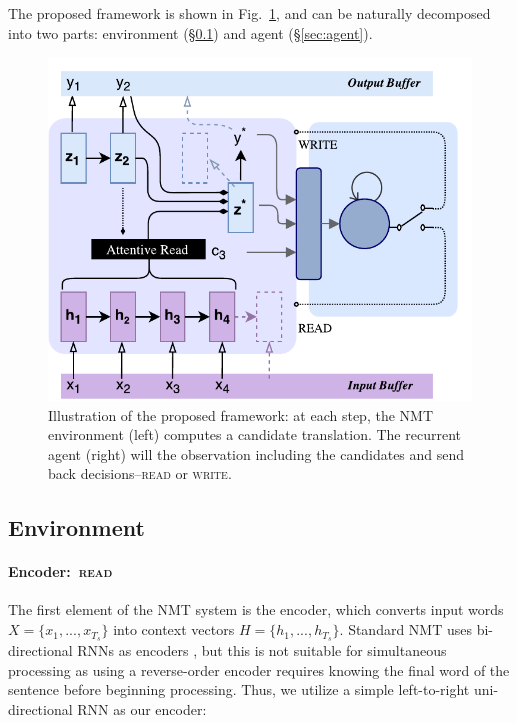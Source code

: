 The proposed framework is shown in Fig.~\ref{snmt}, and can be naturally decomposed into two parts: environment (\S\ref{sec:environment}) and agent (\S\ref{sec:agent}).
\begin{figure}[hptb]
   	\centering
          	\includegraphics[width=\linewidth]{figs/simultrans/SNMT.pdf} 
          	\caption{\label{snmt} {Illustration of the proposed framework: at each step, the NMT environment (left) computes a candidate translation. The recurrent agent (right) will the observation including the candidates and send back decisions--\textsc{read} or \textsc{write}.}} 
  \end{figure} 
  
\subsection{Environment}
\label{sec:environment}
\paragraph{Encoder:~\textsc{read}} 
The first element of the NMT system is the encoder, which converts input words $X=\{x_1, ..., x_{T_s}\}$ into context vectors $H = \{h_1, ..., h_{T_s}\}$.
Standard NMT uses bi-directional RNNs as encoders \cite{bahdanau2014neural}, but this is not suitable for simultaneous processing as using a reverse-order encoder requires knowing the final word of the sentence before beginning processing.
Thus, we utilize a simple left-to-right uni-directional RNN as our encoder:

